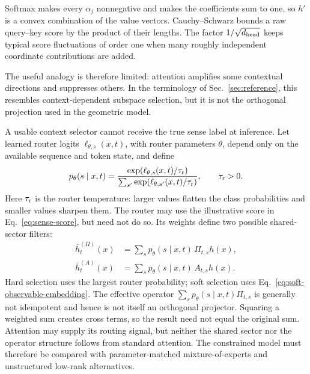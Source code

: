 \documentclass[
  aps,
  reprint,
  superscriptaddress,
  floatfix,
  nofootinbib,
  longbibliography
]{revtex4-2}
\begin{document}
Softmax makes every $\alpha_j$ nonnegative and makes the coefficients sum to
one, so $h'$ is a convex combination of the value vectors.  Cauchy--Schwarz
bounds a raw query--key score by the product of their lengths.  The factor
$1/\sqrt{d_{\rm head}}$ keeps typical score fluctuations of order one when
many roughly independent coordinate contributions are added.

The useful analogy is therefore limited: attention amplifies some contextual
directions and suppresses others.  In the terminology of
Sec.~\ref{sec:reference}, this resembles context-dependent subspace selection,
but it is not the orthogonal projection used in the geometric model.

A usable context selector cannot receive the true sense label at inference.
Let learned router logits $\ell_{\theta,s}(x,t)$, with router parameters
$\theta$, depend only on the available
sequence and token state, and define
%
\begin{equation}
\label{eq:context-temp}
p_\theta(s\mid x,t)=
\frac{\exp(\ell_{\theta,s}(x,t)/\tau_{\rm r})}
{\sum_{s'}\exp(\ell_{\theta,s'}(x,t)/\tau_{\rm r})},
\qquad \tau_{\rm r}>0 .
\end{equation}
%
Here $\tau_{\rm r}$ is the router temperature: larger values flatten the
class probabilities and smaller values sharpen them.
The router may use the illustrative score in Eq.~\eqref{eq:sense-score}, but
need not do so.  Its weights define two possible shared-sector filters:
%
\begin{equation}
\label{eq:soft-observable-embedding}
\begin{aligned}
\bar h_t^{(\Pi)}(x)
&=\sum_s p_\theta(s\mid x,t)\,\Pi_{t,s}h(x),\\
\bar h_t^{(A)}(x)
&=\sum_s p_\theta(s\mid x,t)\,A_{t,s}h(x).
\end{aligned}
\end{equation}
%
Hard selection uses the largest router probability; soft selection uses
Eq.~\eqref{eq:soft-observable-embedding}.  The effective operator
$\sum_s p_\theta(s\mid x,t)\Pi_{t,s}$ is generally not idempotent and hence is
not itself an orthogonal projector.  Squaring a weighted sum creates cross
terms, so the result need not equal the original sum.  Attention may supply its routing signal,
but neither the shared sector nor the operator structure follows from standard
attention.  The constrained model must therefore be compared with
parameter-matched mixture-of-experts and unstructured low-rank alternatives.
\end{document}
